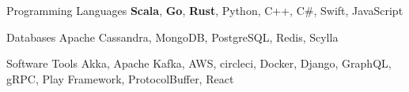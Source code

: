 

\begin{cvskills}

  \cvskill
    {Programming Languages} %
    {{\bf Scala}, {\bf Go}, {\bf Rust}, Python, C++, C\#, Swift, JavaScript} %

  \cvskill
    {Databases} %
    {Apache Cassandra, MongoDB, PostgreSQL, Redis, Scylla} %

  \cvskill
    {Software Tools} %
    {Akka, Apache Kafka, AWS, circleci, Docker, Django, GraphQL, gRPC, Play Framework, ProtocolBuffer, React} %

\end{cvskills}
